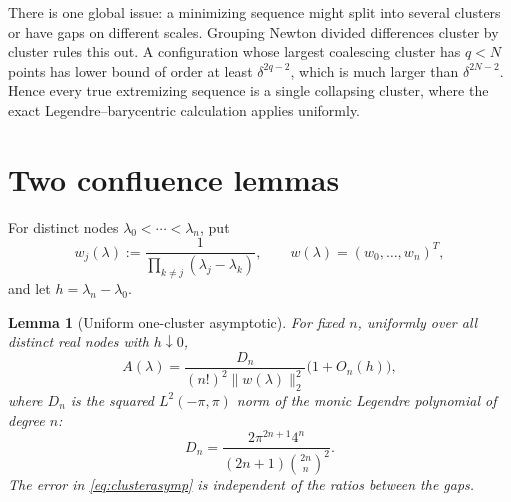 \documentclass[11pt]{article}
\newtheorem{lemma}{Lemma}
\begin{document}
There is one global issue: a minimizing sequence might split into several clusters or have gaps on different scales.  Grouping Newton divided differences cluster by cluster rules this out.  A configuration whose largest coalescing cluster has $q<N$ points has lower bound of order at least $\delta^{2q-2}$, which is much larger than $\delta^{2N-2}$.  Hence every true extremizing sequence is a single collapsing cluster, where the exact Legendre--barycentric calculation applies uniformly.

\section{Two confluence lemmas}

For distinct nodes $\lambda_0<\cdots<\lambda_n$, put
\[
 w_j(\lambda):=\frac{1}{\prod_{k\ne j}(\lambda_j-\lambda_k)},
 \qquad w(\lambda)=(w_0,\ldots,w_n)^T,
\]
and let $h=\lambda_n-\lambda_0$.

\begin{lemma}[Uniform one-cluster asymptotic]\label{lem:onecluster}
For fixed $n$, uniformly over all distinct real nodes with $h\downarrow0$,
\begin{equation}\label{eq:clusterasymp}
 A(\lambda)=
 \frac{D_n}{(n!)^2\|w(\lambda)\|_2^2}\bigl(1+O_n(h)\bigr),
\end{equation}
where $D_n$ is the squared $L^2(-\pi,\pi)$ norm of the monic Legendre polynomial of degree $n$:
\begin{equation}\label{eq:Dn}
 D_n=\frac{2\pi^{2n+1}4^n}
 {(2n+1)\binom{2n}{n}^{2}}.
\end{equation}
The error in \eqref{eq:clusterasymp} is independent of the ratios between the gaps.
\end{lemma}
\end{document}
